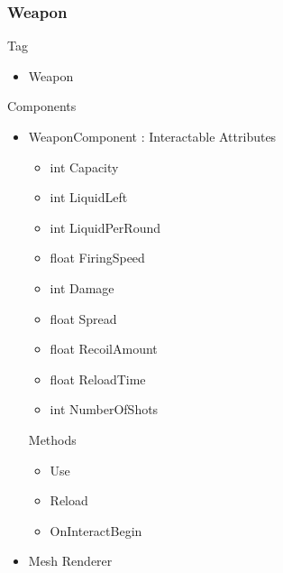 \documentclass[11pt]{article}
\begin{document}
\subsubsection{Weapon}
Tag
\begin{itemize}
\item Weapon
\end{itemize}
Components
\begin{itemize}
\item WeaponComponent : Interactable
\newline Attributes
\begin{itemize}
\item int Capacity
\item int LiquidLeft
\item int LiquidPerRound
\item float FiringSpeed
\item int Damage
\item float Spread
\item float RecoilAmount
\item float ReloadTime
\item int NumberOfShots
\end{itemize}
Methods
\begin{itemize}
\item Use
\item Reload
\item OnInteractBegin
\end{itemize}
\item Mesh Renderer
\end{itemize}
\end{document}
